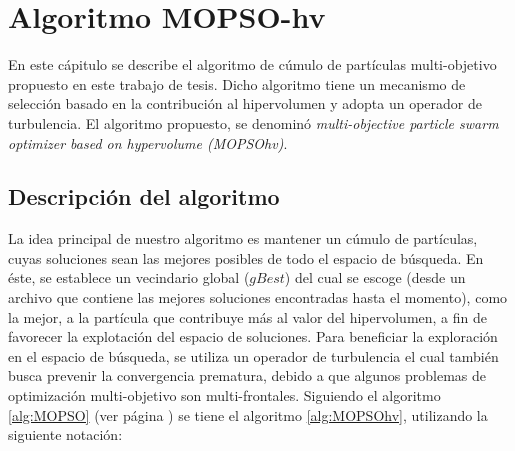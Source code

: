 \chapter{Algoritmo MOPSO-hv}

  En este c\'apitulo se describe el algoritmo de c\'umulo de part\'iculas multi-objetivo propuesto en este trabajo 
  de tesis. Dicho algoritmo tiene un mecanismo de selecci\'on basado en la contribuci\'on al hipervolumen y adopta un operador de turbulencia.
  El algoritmo propuesto, se denomin\'o \textit{multi-objective particle swarm optimizer based on hypervolume (MOPSOhv)}. 

\section*{Descripci\'on del algoritmo}

 La idea principal de nuestro algoritmo es mantener un c\'umulo de part\'iculas, cuyas soluciones sean las mejores posibles de todo el 
 espacio de b\'usqueda. 
 En \'este, se establece un vecindario global ($gBest$) del cual se escoge (desde un archivo que contiene las mejores soluciones 
 encontradas hasta el momento), como la mejor, a la part\'icula que contribuye m\'as al valor del hipervolumen, a fin de favorecer la 
 explotaci\'on del espacio de soluciones. Para beneficiar la exploraci\'on en el espacio de b\'usqueda, se utiliza un operador de 
 turbulencia el cual tambi\'en busca prevenir la convergencia prematura, debido a que algunos problemas de optimizaci\'on multi-objetivo son 
 multi-frontales. \DIFdelbegin {}\DIFdelend Siguiendo el algoritmo \ref{alg:MOPSO} 
 (ver p\'agina \pageref{alg:MOPSO}) se tiene el algoritmo \ref{alg:MOPSOhv}, utilizando la siguiente notaci\'on:

 \DIFdelbegin %
{%
}
\DIFdelend %

